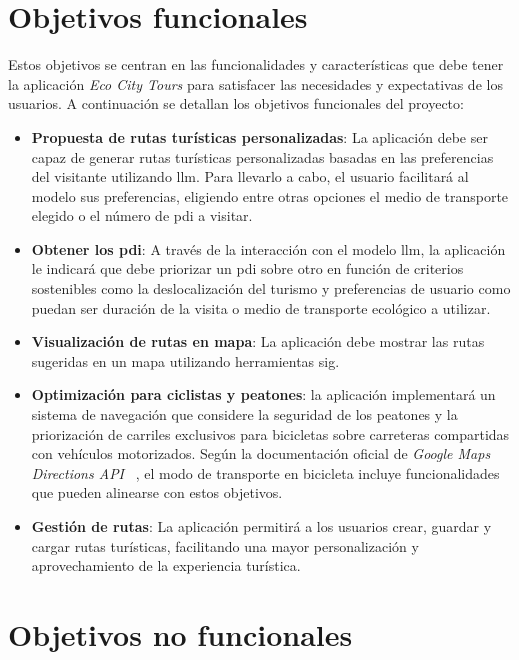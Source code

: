 \label{sec:objetivos}

\section{Objetivos funcionales}

Estos objetivos se centran en las funcionalidades y características que debe tener la aplicación \textit{Eco City Tours} para satisfacer las necesidades y expectativas de los usuarios. A continuación se detallan los objetivos funcionales del proyecto:

\begin{itemize}
    \item \textbf{Propuesta de rutas turísticas personalizadas}: La aplicación debe ser capaz de generar rutas turísticas personalizadas basadas en las preferencias del visitante utilizando \acrfull{llm}. Para llevarlo a cabo, el usuario facilitará al modelo sus preferencias, eligiendo entre otras opciones el medio de transporte elegido o el número de \acrfull{pdi} a visitar.
    \item \textbf{Obtener los \acrfull{pdi}}: A través de la interacción con el modelo \acrshort{llm}, la aplicación le indicará que debe priorizar un \acrshort{pdi} sobre otro en función de criterios sostenibles como la deslocalización del turismo y preferencias de usuario como puedan ser duración de la visita o medio de transporte ecológico a utilizar.
    \item \textbf{Visualización de rutas en mapa}: La aplicación debe mostrar las rutas sugeridas en un mapa utilizando herramientas \acrshort{sig}.
    \item \textbf{Optimización para ciclistas y peatones}: la aplicación implementará un sistema de navegación que considere la seguridad de los peatones y la priorización de carriles exclusivos para bicicletas sobre carreteras compartidas con vehículos motorizados. Según la documentación oficial de \textit{Google Maps Directions API }~\cite{google_directions}, el modo de transporte en bicicleta incluye funcionalidades que pueden alinearse con estos objetivos.
    \item \textbf{Gestión de rutas}: La aplicación permitirá a los usuarios crear, guardar y cargar rutas turísticas, facilitando una mayor personalización y aprovechamiento de la experiencia turística.
    

\end{itemize}

\section{Objetivos no funcionales}

